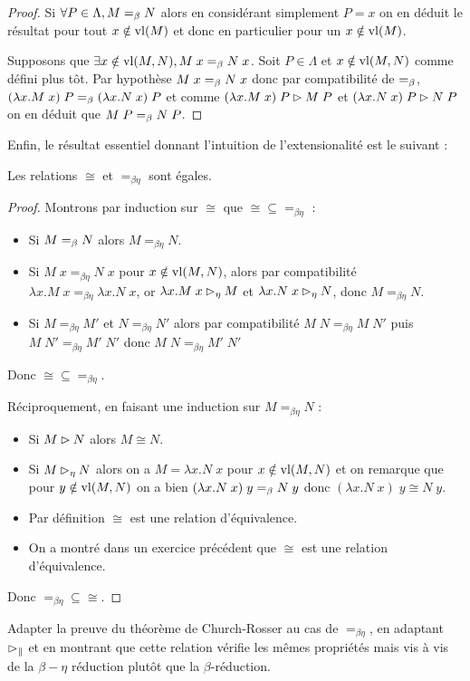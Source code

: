 \begin{proof}
    Si $\forall P\in\Lambda,M=_\beta N$ alors en considérant simplement $P = x$ on en déduit le résultat pour tout $x\notin\mathrm{vl}(M)$ et donc en particulier pour un $x\notin\mathrm{vl}(M)$.

    Supposons que $\exists x\notin\mathrm{vl}(M,N),M\;x=_\beta N\;x$. Soit $P\in\Lambda$ et $x\notin\mathrm{vl}(M,N)$ comme défini plus tôt. Par hypothèse $M\;x=_\beta N\;x$ donc par compatibilité de $=_\beta$, $(\lambda x.M\;x)\;P=_\beta (\lambda x.N\;x)\;P$ et comme $(\lambda x.M\;x)\;P\rhd M\;P$ et $(\lambda x.N\;x)\;P\rhd N\;P$ on en déduit que $M\;P=_\beta N\;P$.
\end{proof}

Enfin, le résultat essentiel donnant l'intuition de l'extensionalité est le suivant :

\begin{them}
    Les relations $\cong$ et $=_{\beta\eta}$ sont égales.
\end{them}

\begin{proof}
    Montrons par induction sur $\cong$ que $\cong\subseteq =_{\beta\eta}$ :
    \begin{itemize}[label=$\bullet$]
        \item Si $M=_\beta N$ alors $M=_{\beta\eta} N$.
        \item Si $M\;x=_{\beta\eta} N\;x$ pour $x\notin\mathrm{vl}(M,N)$, alors par compatibilité $\lambda x.M\;x=_{\beta\eta}\lambda x.N\;x$, or $\lambda x.M\;x\rhd_\eta M$ et $\lambda x.N\;x\rhd_\eta N$, donc $M=_{\beta\eta} N$.
        \item Si $M=_{\beta\eta} M'$ et $N=_{\beta\eta} N'$ alors par compatibilité $M\;N=_{\beta\eta} M\;N'$ puis $M\;N'=_{\beta\eta} M'\;N'$ donc $M\;N=_{\beta\eta} M'\;N'$
    \end{itemize}
    Donc $\cong\subseteq =_{\beta\eta}$.

    Réciproquement, en faisant une induction sur $M=_{\beta\eta} N$ :
    \begin{itemize}[label=$\bullet$]
        \item Si $M\rhd N$ alors $M\cong N$.
        \item Si $M\rhd_\eta N$ alors on a $M = \lambda x.N\;x$ pour $x\notin\mathrm{vl}(M,N)$ et on remarque que pour $y\notin\mathrm{vl}(M,N)$ on a bien $(\lambda x.N\;x)\;y=_\beta N\;y$ donc $(\lambda x.N\;x)\;y\cong N\;y$.
        \item Par définition $\cong$ est une relation d'équivalence.
        \item On a montré dans un exercice précédent que $\cong$ est une relation d'équivalence.
    \end{itemize}
    Donc $=_{\beta\eta}\subseteq \cong$.
\end{proof}

\begin{exo}
    Adapter la preuve du théorème de Church-Rosser au cas de $=_{\beta\eta}$, en adaptant $\rhd_\|$ et en montrant que cette relation vérifie les mêmes propriétés mais vis à vis de la $\beta-\eta$ réduction plutôt que la $\beta$-réduction.
\end{exo}